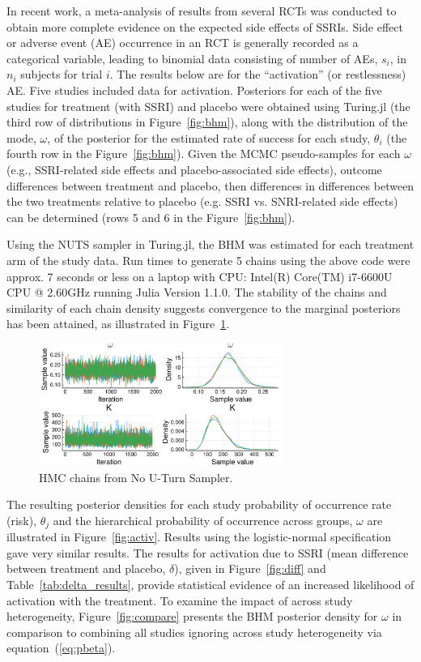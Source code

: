 \documentclass{juliacon}
\begin{document}
{In recent work\cite{Mills2019b}, a meta-analysis of results from several RCTs was conducted to obtain more complete evidence on the expected side effects of SSRIs.  Side effect or adverse event (AE) occurrence in an RCT is generally recorded as a categorical variable, leading to binomial data consisting of number of AEs, $s_i$, in $n_i$ subjects for trial $i$. The results below are for the  “activation” (or restlessness) AE.  Five studies included data for activation.  Posteriors for each of the five studies for treatment (with SSRI) and placebo were obtained using Turing.jl (the third row of distributions in Figure~\ref{fig:bhm}), along with the distribution of the mode, $\omega$, of the posterior for the estimated rate of success for each study, $\theta_i$ (the fourth row in the Figure~\ref{fig:bhm}).  Given the MCMC pseudo-samples for each $\omega$ (e.g., SSRI-related side effects and placebo-associated side effects), outcome differences between treatment and placebo, then differences in differences between the two treatments relative to placebo (e.g. SSRI vs. SNRI-related side effects) can be determined (rows 5 and 6 in the Figure~\ref{fig:bhm}).
\vskip 6pt

Using the NUTS sampler in Turing.jl, the BHM was estimated for each treatment arm of the study data. Run times to generate 5 chains using the above code were approx. 7 seconds or less on a laptop with CPU: Intel(R) Core(TM) i7-6600U CPU @ 2.60GHz running Julia Version 1.1.0. The stability of the chains and similarity of each chain density suggests convergence to the marginal posteriors has been attained, as illustrated in Figure~\ref{fig:chains}.
\begin{figure}[t]
	\centerline{\includegraphics[width=8cm]{omega_K_mcmcplot.pdf}}
	\caption{HMC chains from No U-Turn Sampler.}
	\label{fig:chains}
	\end{figure}

The resulting posterior densities for each study probability of occurrence rate (risk), $\theta_j$ and the hierarchical probability of occurrence across groups, $\omega$ are illustrated in Figure~\ref{fig:activ}. Results using the logistic-normal specification gave very similar results. The results for activation due to SSRI (mean difference between treatment and placebo, $\delta$), given in Figure~\ref{fig:diff} and Table~\ref{tab:delta_results}, provide statistical evidence of an increased likelihood of activation with the treatment. To examine the impact of across study heterogeneity, Figure~\ref{fig:compare} presents the BHM posterior density for $\omega$ in comparison to combining all studies ignoring across study heterogeneity via equation~(\ref{eq:pbeta}).

}
\end{document}
